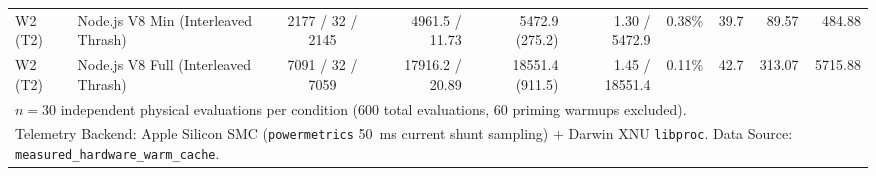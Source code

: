 \begin{table}[t]
\begin{tabular}{l l c r r r r r r r}
W2 (T2) & Node.js V8 Min (Interleaved Thrash) & 2177 / 32 / 2145 & 4961.5 / 11.73 & 5472.9 (275.2) & 1.30 / 5472.9 & 0.38\% & 39.7 & 89.57 & 484.88 \\
W2 (T2) & Node.js V8 Full (Interleaved Thrash) & 7091 / 32 / 7059 & 17916.2 / 20.89 & 18551.4 (911.5) & 1.45 / 18551.4 & 0.11\% & 42.7 & 313.07 & 5715.88 \\
\hline
\multicolumn{10}{l}{\footnotesize $n = 30$ independent physical evaluations per condition (600 total evaluations, 60 priming warmups excluded).} \\
\multicolumn{10}{l}{\footnotesize Telemetry Backend: Apple Silicon SMC (\texttt{powermetrics} 50~ms current shunt sampling) + Darwin XNU \texttt{libproc}. Data Source: \texttt{measured\_hardware\_warm\_cache}.} \\
\hline
\end{tabular}
\end{table}
